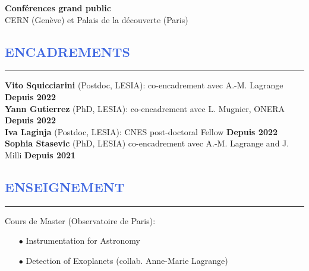 \documentclass[11pt, a4paper, french]{article}
\begin{document}
\vspace{0.4cm}
\textbf{Conférences grand public}   \\
\hspace{0.3cm} CERN (Genève) et Palais de la découverte (Paris)\\



\vspace{-0.8cm}
\textcolor{RoyalBlue}{\section{\large ENCADREMENTS}
\vspace{-0.2cm}\hrule}
\vspace{0.4cm}
\textbf{Vito Squicciarini} (Postdoc, LESIA): co-encadrement avec A.-M. Lagrange \hfill \textbf{Depuis 2022}\\
\textbf{Yann Gutierrez} (PhD, LESIA): co-encadrement avec L. Mugnier, ONERA \hfill \textbf{Depuis 2022}\\
\textbf{Iva Laginja} (Postdoc, LESIA): CNES post-doctoral Fellow \hfill \textbf{Depuis 2022}\\
\textbf{Sophia Stasevic} (PhD, LESIA) co-encadrement avec A.-M. Lagrange and J. Milli \hfill \textbf{Depuis 2021}\\

\vspace{-0.1cm}
\textcolor{RoyalBlue}{\section{\large ENSEIGNEMENT}
\vspace{-0.2cm}\hrule}
\vspace{0.4cm}
Cours de Master (Observatoire de Paris):
\begin{itemize} \itemsep -2pt
    \item[$\bullet$] Instrumentation for Astronomy 
    \item[$\bullet$] Detection of Exoplanets (collab. Anne-Marie Lagrange)
\end{itemize}
\end{document}
